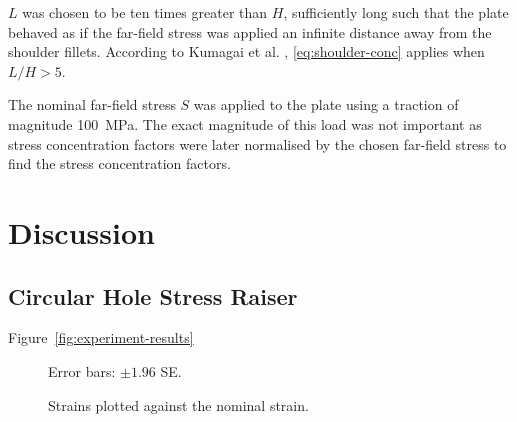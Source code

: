 \documentclass[a4paper,11pt,twocolumn]{article}
\newcommand{\MPa}{\si{\mega\pascal}\xspace}
\begin{document}
{$L$ was chosen to be ten times greater than $H$, sufficiently long such that the
plate behaved as if the far-field stress was applied an infinite distance away
from the shoulder fillets. According to Kumagai et al. \cite{kumagai1968stress},
\eqref{eq:shoulder-conc} applies when $L/H > 5$.

The nominal far-field stress $S$ was applied to the plate using a traction of
magnitude 100~\MPa. The exact magnitude of this load was not important as stress
concentration factors were later normalised by the chosen far-field stress to
find the stress concentration factors.

\section{Discussion}

\subsection{Circular Hole Stress Raiser}

Figure~\vref{fig:experiment-results}


\begin{figure}[t]
    \centering
    \begin{footnotesize}
        Error bars: $\pm 1.96$ \textsc{SE}.
    \end{footnotesize}
    \caption{Strains plotted against the nominal strain.}
    \label{fig:experiment-results}
\end{figure}

}
\end{document}
